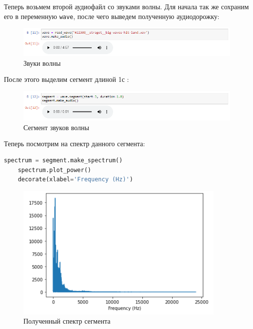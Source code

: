 \documentclass[a4paper]{article}
\begin{document}
            Теперь возьмем второй аудиофайл со звуками волны. Для начала так же сохраним его в переменную \texttt{wave}, после чего выведем полученную аудиодорожку:
            
\begin{figure}[H]
                \centering
                \includegraphics[width=\textwidth]{ex_1_wave_audio.png}
                \caption{Звуки волны}
                \label{fig:ex_1_wave_audio}
            \end{figure}
            
            После этого выделим сегмент длиной 1с :
            
            \begin{figure}[H]
                \centering
                \includegraphics[width=\textwidth]{ex_1_wave_segment_audio.png}
                \caption{Сегмент звуков волны}
                \label{fig:ex_1_wave_segment_audio}
            \end{figure}
            
            Теперь посмотрим на спектр данного сегмента:
            
\begin{lstlisting}[language=Python, caption= Получение спектра сегмента]
    spectrum = segment.make_spectrum()
    spectrum.plot_power()
    decorate(xlabel='Frequency (Hz)')
\end{lstlisting}               
            
            \begin{figure}[H]
                \centering
                \includegraphics{ex_1_wave_spectr.png}
                \caption{Полученный спектр сегмента}
                \label{fig:ex_1_wave_spectr}
            \end{figure}
            
\end{document}
